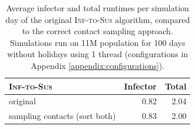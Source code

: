 \begin{table}
    \centering
    \begin{tabular}{@{}lrr@{}}
        \toprule
        \textsc{Inf-to-Sus}                   & Infector & Total \\ \midrule
        original                              & 0.82     & 2.04  \\
        sampling contacts (sort both)         & 0.83     & 2.00  \\ \bottomrule
    \end{tabular}
    \caption{Average infector and total runtimes per simulation day of the original \textsc{Inf-to-Sus} algorithm, compared to the correct contact sampling approach. Simulations run on 11M population for 100 days without holidays using 1 thread (configurations in Appendix \ref{appendix:configurations}).}
    \label{tab:runtimes_its_sampling_contacts}
\end{table}

